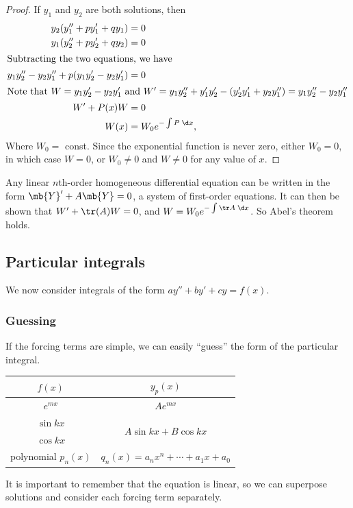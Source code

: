 \documentclass[a4paper]{article}
\begin{document}
\begin{proof}
  If $y_1$ and $y_2$ are both solutions, then 
  \begin{align*}
    y_2(y_1'' + py_1' + qy_1) &= 0\\
    y_1(y_2'' + py_2' + qy_2) &= 0\\
    \intertext{Subtracting the two equations, we have}
    y_1y_2'' - y_2y_1'' + p(y_1y_2' - y_2y_1') &= 0\\
    \intertext{Note that $W =y_1y_2' - y_2y_1'$ and $W' = y_1y_2'' + y_1'y_2' - (y_2'y_1' + y_2y_1'') = y_1y_2'' - y_2y_1''$}
    W' + P(x)W &= 0\\
    W(x) &= W_0 e^{-\int P\; \d x},
  \end{align*}
  Where $W_0 = $ const. Since the exponential function is never zero, either $W_0 = 0$, in which case $W = 0$, or $W_0 \not= 0$ and $W \not= 0$ for any value of $x$.
\end{proof}
\note Any linear $n$th-order homogeneous differential equation can be written in the form $\mb{Y}' + A\mb{Y} = 0$, a system of first-order equations. It can then be shown that $W' + \tr(A)W = 0$, and $W = W_0e^{-\int \tr A\;\d x}$. So Abel's theorem holds.

\subsection{Particular integrals}
We now consider integrals of the form $ay'' + by' + cy = f(x)$.

\subsubsection{Guessing}
If the forcing terms are simple, we can easily ``guess'' the form of the particular integral.

\vspace{4pt}
\noindent
\begin{tabular}{cc}
  \toprule
  $f(x)$ & $y_p(x)$\\
  \midrule
  $e^{mx}$ & $Ae^{mx}$\\
  $\sin kx$ & \multirow{2}{*}{$A\sin kx + B\cos kx$}\\
  $\cos kx$ & \\
  polynomial $p_n(x)$ & $q_n(x) = a_nx^n + \cdots + a_1x + a_0$\\
  \bottomrule
\end{tabular}
\vspace{4pt}

It is important to remember that the equation is linear, so we can superpose solutions and consider each forcing term separately.
\end{document}

